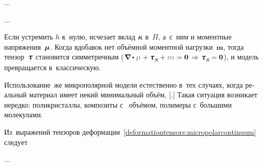 \begin{otherlanguage}{russian}
...



...

Если устремить $h$ к~нулю, исчезает вклад $\bm{\kappa}\hspace{-0.1ex}$ в~$\Pi$, а~с~ним и моментные напряжения~$\bm{\mu}$.
Когда вдобавок нет объёмной моментной нагрузки~$\bm{m}$, тогда тензор~$\forcestresstensor$ становится симметричным (${\boldnabla \dotp {\color{black!40}{\couplestresstensor}} \hspace{.1ex} + \forcestresstensor_{\Xcompanion} \hspace{-0.1ex} + {\color{black!40}{\bm{m}}} \hspace{.1ex} = \bm{0} \,\Rightarrow \hspace{.2ex} \forcestresstensor_{\Xcompanion} \hspace{-0.2ex} = \bm{0}}$), и модель превращается в~классическую.

Использование~же микрополярной модели естественно в~тех случаях, когда реальный материал имеет некий минимальный объём, [.] Такая ситуация возникает нередко: поликристаллы, композиты с~ объёмом, полимеры с~большими молекулами.

\end{otherlanguage}



\label{para:compatibilityequations.cosseratcontinuum}

\begin{otherlanguage}{russian}

Из~выражений тензоров деформации~\eqref{deformationtensors:micropolarcontinuum} следует

...



\end{otherlanguage}

